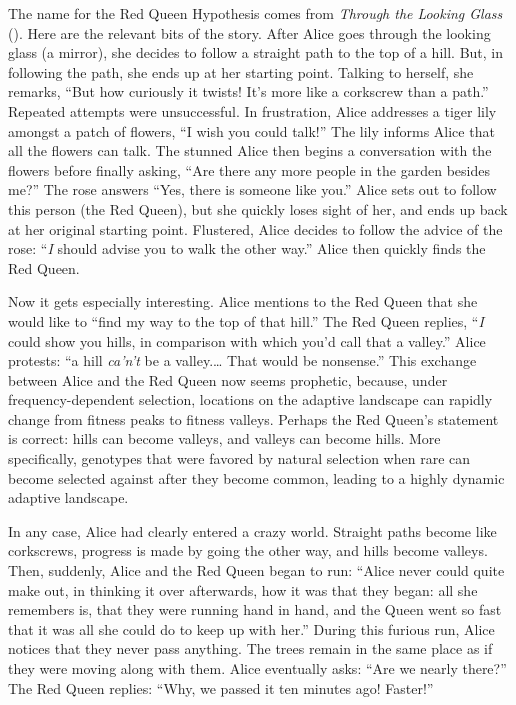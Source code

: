 \documentclass[
  american,
  letterpaper,
]{book}
\begin{document}
The name for the Red Queen Hypothesis comes from \emph{Through the
Looking Glass} (). Here are the
relevant bits of the story. After Alice goes through the looking glass
(a mirror), she decides to follow a straight path to the top of a hill.
But, in following the path, she ends up at her starting point. Talking
to herself, she remarks, ``But how curiously it twists! It's more like a
corkscrew than a path.'' Repeated attempts were unsuccessful. In
frustration, Alice addresses a tiger lily amongst a patch of flowers,
``I wish you could talk!'' The lily informs Alice that all the flowers
can talk. The stunned Alice then begins a conversation with the flowers
before finally asking, ``Are there any more people in the garden besides
me?'' The rose answers ``Yes, there is someone like you.'' Alice sets
out to follow this person (the Red Queen), but she quickly loses sight
of her, and ends up back at her original starting point. Flustered,
Alice decides to follow the advice of the rose: ``\emph{I} should advise
you to walk the other way.'' Alice then quickly finds the Red Queen.

Now it gets especially interesting. Alice mentions to the Red Queen that
she would like to ``find my way to the top of that hill.'' The Red Queen
replies, ``\emph{I} could show you hills, in comparison with which you'd
call that a valley.'' Alice protests: ``a hill \emph{ca'n't} be a
valley.\ldots{} That would be nonsense.'' This exchange between Alice
and the Red Queen now seems prophetic, because, under
frequency-dependent selection, locations on the adaptive landscape can
rapidly change from fitness peaks to fitness valleys. Perhaps the Red
Queen's statement is correct: hills can become valleys, and valleys can
become hills. More specifically, genotypes that were favored by natural
selection when rare can become selected against after they become
common, leading to a highly dynamic adaptive landscape.

In any case, Alice had clearly entered a crazy world. Straight paths
become like corkscrews, progress is made by going the other way, and
hills become valleys. Then, suddenly, Alice and the Red Queen began to
run: ``Alice never could quite make out, in thinking it over afterwards,
how it was that they began: all she remembers is, that they were running
hand in hand, and the Queen went so fast that it was all she could do to
keep up with her.'' During this furious run, Alice notices that they
never pass anything. The trees remain in the same place as if they were
moving along with them. Alice eventually asks: ``Are we nearly there?''
The Red Queen replies: ``Why, we passed it ten minutes ago! Faster!''
\end{document}
